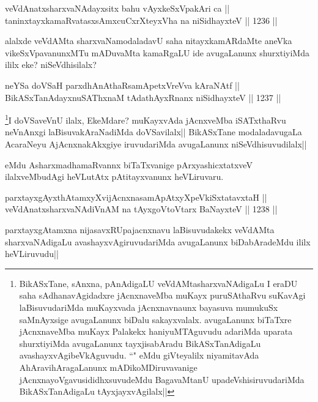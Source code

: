 \begin{shl}
veVdAnatxsharxvaNAdayxsitx bahu vAyxkeSxVpakAri ca ||  \\
taninxtayxkamaRvatasxsAmxcuCxrXteyxVha na niSidhayxteV ||  1236 ||  
\end{shl}

\begin{artha}
alalxde veVdAMta sharxvaNamodaladavU saha nitayxkamARdaMte aneVka vikeSxVpavanunxMTu mADuvaMta kamaRgaLU ide avugaLanunx shurxtiyiMda ililx eke? niSeVdhisilalx?
\end{artha}


\begin{shl}
neYSa doVSaH parxdhAnAthaRsamApetxVreVva kAraNAtf || \\
BikASxTanAdayxnuSAThxnaM tAdathAyxRnanx niSidhayxteV ||  1237 ||  
\end{shl}

\begin{artha}
\footnote{BikASxTane, sAnxna, pAnAdigaLU veVdAMtasharxvaNAdigaLu I eraDU saha sAdhanavAgidadxre jAcnxnaveMba muKayx puruSAthaRvu suKavAgi laBisuvudariMda muKayxvada jAcnxnavnaunx bayasuva mumukuSx saMnAyxsige avugaLanunx biDalu sakayxvalalx. avugaLanunx biTaTxre jAcnxnaveMba muKayx Palakekx haniyuMTAguvudu adariMda uparata shurxtiyiMda avugaLanunx tayxjisabAradu BikASxTanAdigaLu avashayxvAgibeVkAguvudu. ``\stext" eMdu giVteyalilx niyamitavAda AhAravihAragaLanunx mADikoMDiruvavanige jAcnxnayoVgavusididhxsuvudeMdu BagavaMtanU upadeVshisiruvudariMda BikASxTanAdigaLu tAyxjayxvAgilalx||}I doVSaveVnU ilalx, EkeMdare? muKayxvAda jAcnxveMba iSATxthaRvu neVnAnxgi laBisuvakAraNadiMda doVSavilalx|| BikASxTane modaladavugaLa AcaraNeyu AjAcnxnakAkxgiye iruvudariMda avugaLanunx niSeVdhisuvudilalx||
\end{artha}

\begin{artha}
eMdu AsharxmadhamaRvannx biTaTxvanige pArxyashicxtatxveV ilalxveMbudAgi heVLutAtx pAtitayxvanunx heVLiruvaru.
\end{artha}

\begin{shl}
parxtayxgAyxthAtamxyXvijAcnxnasamApAtxyX\s peVkiSxtatavxtaH ||  \\
veVdAnatxsharxvaNAdiVnAM na tAyxgoV\s toV\s tarx BaNayxteV ||  1238 ||  
\end{shl}

\begin{artha}
parxtayxgAtamxna nijasavxRUpajacnxnavu laBisuvudakekx veVdAMta sharxvaNAdigaLu avashayxvAgiruvudariMda avugaLanunx biDabAradeMdu ililx heVLiruvudu||
\end{artha}

